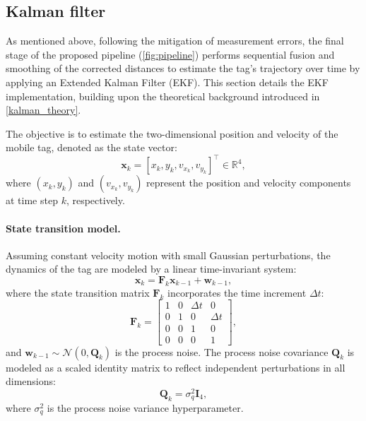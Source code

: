 \subsection{Kalman filter}

As mentioned above, following the mitigation of measurement errors, the final stage of the proposed pipeline (\autoref{fig:pipeline}) performs sequential fusion and smoothing of the corrected distances to estimate the tag's trajectory over time by applying an Extended Kalman Filter (EKF). This section details the EKF implementation, building upon the theoretical background introduced in \autoref{kalman_theory}.

The objective is to estimate the two-dimensional position and velocity of the mobile tag, denoted as the state vector:
\begin{equation}
        \mathbf{x}_k = [x_k, y_k, v_{x_k}, v_{y_k}]^\top \in \mathbb{R}^4,
\end{equation}
where $(x_k, y_k)$ and $(v_{x_k}, v_{y_k})$ represent the position and velocity components at time step $k$, respectively.

\paragraph{State transition model.}

Assuming constant velocity motion with small Gaussian perturbations, the dynamics of the tag are modeled by a linear time-invariant system:
\begin{equation}
    \mathbf{x}_k = \mathbf{F}_k \mathbf{x}_{k-1} + \mathbf{w}_{k-1},
\end{equation}
where the state transition matrix $\mathbf{F}_k$ incorporates the time increment $\Delta t$:
\begin{equation}
    \mathbf{F}_k =
    \begin{bmatrix}
        1 & 0 & \Delta t & 0 \\
        0 & 1 & 0 & \Delta t \\
        0 & 0 & 1 & 0 \\
        0 & 0 & 0 & 1
    \end{bmatrix},
\end{equation}
and $\mathbf{w}_{k-1} \sim \mathcal{N}(0, \mathbf{Q}_k)$ is the process noise. The process noise covariance $\mathbf{Q}_k$ is modeled as a scaled identity matrix to reflect independent perturbations in all dimensions:
\begin{equation}
    \mathbf{Q}_k = \sigma^2_q \mathbf{I}_4,
\end{equation}
where $\sigma^2_q$ is the process noise variance hyperparameter.

